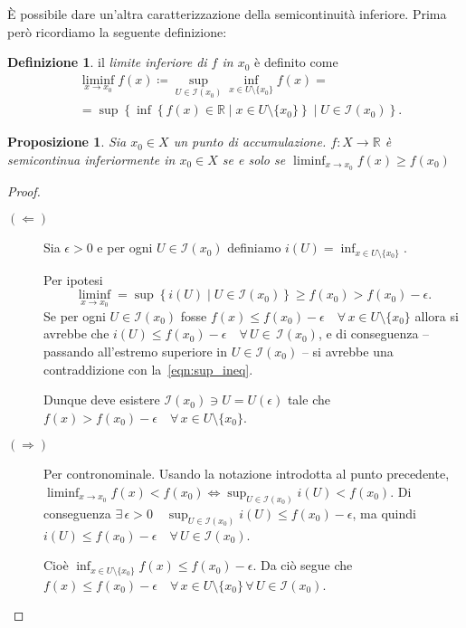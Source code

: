 \documentclass[a4paper, 11pt]{article}
\newcommand{\R}{\mathbb{R}}
\newcommand{\I}[1]{\mathcal{I}(#1)}
\theoremstyle{plain} 	%
\newtheorem{proposizione}{Proposizione}
\theoremstyle{definition}
\newtheorem{definizione}{Definizione}
\theoremstyle{remark}
\begin{document}
    \`E possibile dare un'altra caratterizzazione della semicontinuità inferiore. Prima però ricordiamo la seguente definizione:
    \begin{definizione} il \emph{limite inferiore di $f$ in $x_0$} è definito come
        \begin{align*}
            & \liminf_{x\to x_0}f(x)\coloneqq\sup_{U\in\I{x_0}}\inf_{x\in U\setminus\{x_0\}} f(x)=\\
            & =\sup\left\{\inf\left\{f(x)\in\R\mid x\in U\setminus\{x_0\}\right\}\mid U\in\I{x_0}\right\}.            
        \end{align*}
    \end{definizione}
    \begin{proposizione}\label{prop:liminf}
        Sia $x_0\in X$ un punto di accumulazione. $f\colon X\to\R$ è semicontinua inferiormente in $x_0\in X$ se e solo se $\liminf_{x\to x_0}f(x)\ge f(x_0)$
    \end{proposizione}
    \begin{proof}
        \begin{description}
            \item[$\left(\Longleftarrow\right)$] 
            Sia $\epsilon>0$ e per ogni $U\in\I{x_0}$ definiamo $i(U)=\inf_{x\in U\setminus\{x_0\}}$.

            Per ipotesi 
            \begin{equation}\label{eqn:sup_ineq}
                \liminf_{x\to x_0}=\sup\left\{i(U)\mid U\in\I{x_0}\right\}\ge f(x_0)>f(x_0)-\epsilon.
            \end{equation}
            Se per ogni $U\in\I{x_0}$ fosse $f(x)\le f(x_0)-\epsilon\quad\forall\,x\in U\setminus\{x_0\}$ allora si avrebbe che $i(U)\le f(x_0)-\epsilon\quad\forall\,U\in\,\I{x_0}$, e di conseguenza -- passando all'estremo superiore in $U\in\I{x_0}$ -- si avrebbe una contraddizione con la~\eqref{eqn:sup_ineq}.

            Dunque deve esistere $\I{x_0}\ni U=U(\epsilon)$ tale che $f(x)>f(x_0)-\epsilon\quad\forall\,x\in U\setminus\{x_0\}$.
            \item[$\left(\Longrightarrow\right)$] Per contronominale. Usando la notazione introdotta al punto precedente, $\liminf_{x\to x_0}f(x)<f(x_0)\iff\sup_{U\in\I{x_0}}i(U)<f(x_0)$. Di conseguenza $\exists\,\epsilon>0\quad\sup_{U\in\I{x_0}}i(U)\le f(x_0)-\epsilon$, ma quindi $i(U)\le f(x_0)-\epsilon\quad\forall\,U\in\I{x_0}$.

            Cioè $\inf_{x\in U\setminus\{x_0\}}f(x)\le f(x_0)-\epsilon$. Da ciò segue che $f(x)\le f(x_0)-\epsilon\quad\forall\,x\in U\setminus\{x_0\}\,\forall\,U\in\I{x_0}$.\qedhere
        \end{description}
    \end{proof}
\end{document}
